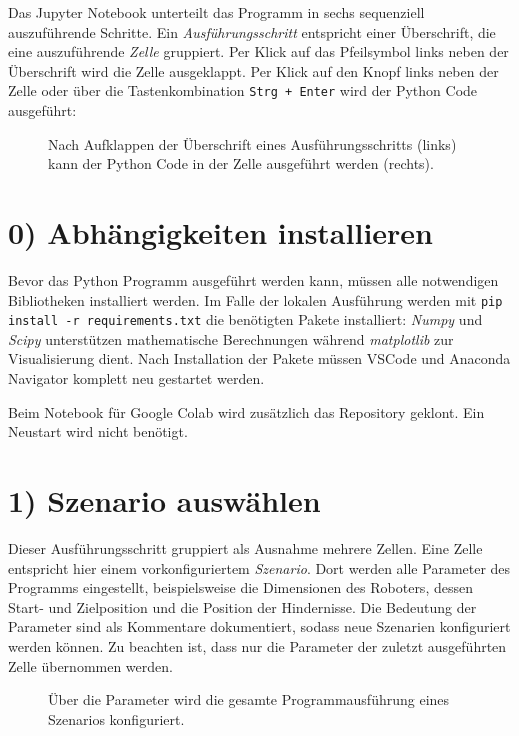 Das Jupyter Notebook unterteilt das Programm in sechs sequenziell auszuführende Schritte. Ein \textit{Ausführungsschritt} entspricht einer Überschrift, die eine auszuführende \textit{Zelle} gruppiert. Per Klick auf das Pfeilsymbol links neben der Überschrift wird die Zelle ausgeklappt. Per Klick auf den Knopf links neben der Zelle oder über die Tastenkombination \texttt{Strg + Enter} wird der Python Code ausgeführt:
\begin{figure}[H]
	\centering
	\footnotesize
	\centerline{}
	\caption{Nach Aufklappen der Überschrift eines Ausführungsschritts (links) kann der Python Code in der Zelle ausgeführt werden (rechts).}
\end{figure}

\section*{0) Abhängigkeiten installieren}
Bevor das Python Programm ausgeführt werden kann, müssen alle notwendigen Bibliotheken installiert werden. Im Falle der lokalen Ausführung werden mit \texttt{pip install -r requirements.txt} die benötigten Pakete installiert: \textit{Numpy} und \textit{Scipy} unterstützen mathematische Berechnungen während \textit{matplotlib} zur Visualisierung dient. Nach Installation der Pakete müssen VSCode und Anaconda Navigator komplett neu gestartet werden.

Beim Notebook für Google Colab wird zusätzlich das Repository geklont. Ein Neustart wird nicht benötigt.

\section*{1) Szenario auswählen}
Dieser Ausführungsschritt gruppiert als Ausnahme mehrere Zellen. Eine Zelle entspricht hier einem vorkonfiguriertem \textit{Szenario}. Dort werden alle Parameter des Programms eingestellt, beispielsweise die Dimensionen des Roboters, dessen Start- und Zielposition und die Position der Hindernisse.
Die Bedeutung der Parameter sind als Kommentare dokumentiert, sodass neue Szenarien konfiguriert werden können. Zu beachten ist, dass nur die Parameter der zuletzt ausgeführten Zelle übernommen werden.
\begin{figure}[H]
	\centering
	\footnotesize
	\centerline{}
	\caption{Über die Parameter wird die gesamte Programmausführung eines Szenarios konfiguriert.}
\end{figure}

